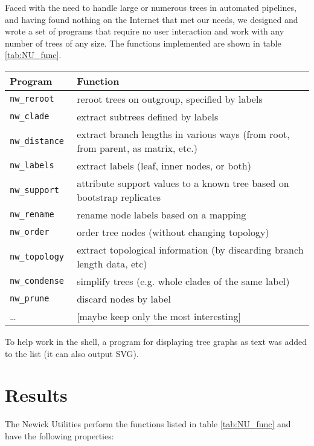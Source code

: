\documentclass[a4paper,11pt]{article}
\newcommand{\prog}[1][]{\tt nw\_#1}
\begin{document}
Faced with the need to handle large or numerous trees in automated pipelines, and having found nothing on the Internet that met our needs, we designed and wrote
a set of programs that require no user interaction and work with any number of
trees of any size. The functions implemented are shown in table \ref{tab:NU_func}.

\begin{table*}
\begin{tabular}{lp{}}
Program & Function \\ 
\hline 
\prog{reroot} & reroot trees on outgroup, specified by labels \\
\prog{clade} & extract subtrees defined by labels \\
\prog{distance} & extract branch lengths in various ways (from root, from parent, as matrix, etc.) \\
\prog{labels} & extract labels (leaf, inner nodes, or both) \\
\prog{support} & attribute support values to a known tree based on bootstrap replicates \\
\prog{rename} & rename node labels based on a mapping \\
\prog{order} & order tree nodes (without changing topology) \\
\prog{topology} & extract topological information (by discarding branch length data, etc) \\
\prog{condense} & simplify trees (e.g. whole clades of the same label) \\
\prog{prune} & discard nodes by label \\
 \ldots & [maybe keep only the most interesting] \\
\hline
\end{tabular}
\caption{The Newick Utilities and their functions}
\label{tab:NU_func}
\end{table*}

To help work in the shell, a program for displaying tree graphs as text was added to the list (it can also output SVG).

\section*{Results}

The Newick Utilities perform the functions listed in table \ref{tab:NU_func} and have the following properties:
\end{document}
